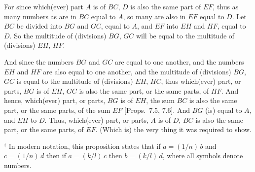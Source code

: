 \begin{Parallel}{}{}
{For since which(ever) part $A$ is of $BC$, $D$ is also the same part of $EF$, thus
as many numbers as are in $BC$ equal to $A$, so many are also in $EF$ equal to
$D$. Let $BC$ be divided into $BG$ and $GC$, equal to $A$, and $EF$ into
$EH$ and $HF$, equal to $D$. So the multitude of (divisions) $BG$, $GC$ will be
equal to the multitude of (divisions) $EH$, $HF$.

And since the numbers $BG$ and $GC$ are equal to one another, and
the numbers $EH$ and $HF$ are also equal to one another, and the
multitude of (divisions) $BG$, $GC$ is equal to the multitude of (divisions)
$EH$, $HC$, thus which(ever) part, or parts, $BG$ is of $EH$, $GC$ is also
the same part, or the same parts, of $HF$. And hence, which(ever)
part, or parts, $BG$ is of $EH$, the sum $BC$ is also the same
part, or the same parts, of the sum $EF$ [Props.~7.5, 7.6]. And $BG$ (is) equal to $A$, and $EH$ to $D$.
 Thus, which(ever) part, or parts, $A$ is of $D$, $BC$ is also the same part, or
 the same parts, of $EF$. (Which is) the very thing it was required to show.}
\end{Parallel}
{\footnotesize\noindent$^\dag$ In modern notation, this
proposition states that if $a=(1/n)\,b$ and $c=(1/n)\,d$ then if $a=(k/l)\,c$
then $b = (k/l)\,d$, where all symbols denote numbers.}

